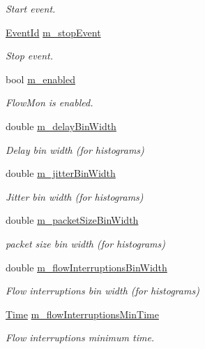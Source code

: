 \begin{DoxyCompactItemize}
\begin{DoxyCompactList}\small\item\em Start event. \end{DoxyCompactList}\item 
\hyperlink{classns3_1_1EventId}{Event\+Id} \hyperlink{classns3_1_1FlowMonitor_adb907fb61dc3bde7f6568d0860552f1e}{m\+\_\+stop\+Event}
\begin{DoxyCompactList}\small\item\em Stop event. \end{DoxyCompactList}\item 
bool \hyperlink{classns3_1_1FlowMonitor_a26ecae1b883d6625091b07e2698f0d45}{m\+\_\+enabled}
\begin{DoxyCompactList}\small\item\em Flow\+Mon is enabled. \end{DoxyCompactList}\item 
double \hyperlink{classns3_1_1FlowMonitor_ac8f534e4fc447540021387c854ec8fc1}{m\+\_\+delay\+Bin\+Width}
\begin{DoxyCompactList}\small\item\em Delay bin width (for histograms) \end{DoxyCompactList}\item 
double \hyperlink{classns3_1_1FlowMonitor_a77909688b3900c5a60059f414900d23d}{m\+\_\+jitter\+Bin\+Width}
\begin{DoxyCompactList}\small\item\em Jitter bin width (for histograms) \end{DoxyCompactList}\item 
double \hyperlink{classns3_1_1FlowMonitor_a95ee97272b70c081d3906028fd2d8252}{m\+\_\+packet\+Size\+Bin\+Width}
\begin{DoxyCompactList}\small\item\em packet size bin width (for histograms) \end{DoxyCompactList}\item 
double \hyperlink{classns3_1_1FlowMonitor_a3a4a61e0ec306d29b8f37fdecd81ad16}{m\+\_\+flow\+Interruptions\+Bin\+Width}
\begin{DoxyCompactList}\small\item\em Flow interruptions bin width (for histograms) \end{DoxyCompactList}\item 
\hyperlink{classns3_1_1Time}{Time} \hyperlink{classns3_1_1FlowMonitor_a6d2163354ea89ab71ff2b573502c66b5}{m\+\_\+flow\+Interruptions\+Min\+Time}
\begin{DoxyCompactList}\small\item\em Flow interruptions minimum time. \end{DoxyCompactList}\end{DoxyCompactItemize}
